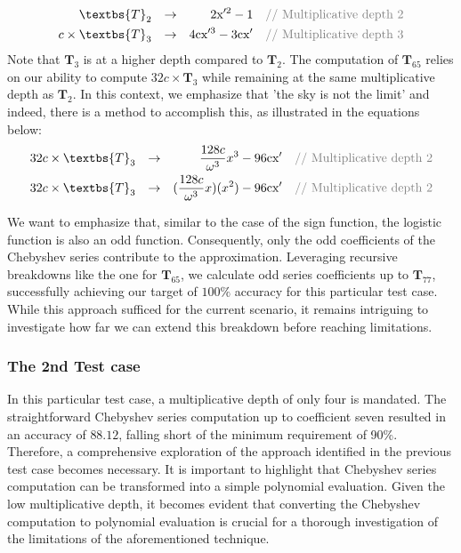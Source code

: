 \documentclass[journal=tosc,final]{iacrtrans}
\begin{document}
 \begin{align}
    \textbs{T}_{2} && \rightarrow && \text{2x}'^2-1 && \text{\textcolor{gray}{// Multiplicative depth 2}}\\
    c\times\textbs{T}_{3} && \rightarrow && \text{4cx}'^3-\text{3cx}'  && \text{\textcolor{gray}{// Multiplicative depth 3}}
\end{align}
Note that $\textbf{T}_3$ is at a higher depth compared to $\textbf{T}_2$. The computation of $\textbf{T}_{65}$ relies on our ability to compute $32c\times\textbf{T}_3$ while remaining at the same multiplicative depth as $\textbf{T}_2$. In this context, we emphasize that 'the sky is not the limit' and indeed, there is a method to accomplish this, as illustrated in the equations below:
\begin{align}
     32c\times\textbs{T}_{3} && \rightarrow && \frac{128c}{\omega^3} x^3-\text{96cx}'  && \text{\textcolor{gray}{// Multiplicative depth 2}}\\
     32c\times\textbs{T}_{3} && \rightarrow && (\frac{128c}{\omega^3}x)(x^2)-\text{96cx}'  && \text{\textcolor{gray}{// Multiplicative depth 2}}
\end{align}

We want to emphasize that, similar to the case of the sign function, the logistic function is also an odd function. Consequently, only the odd coefficients of the Chebyshev series contribute to the approximation. Leveraging recursive breakdowns like the one for $\textbf{T}_{65}$, we calculate odd series coefficients up to $\textbf{T}_{77}$, successfully achieving our target of $100\%$ accuracy for this particular test case. While this approach sufficed for the current scenario, it remains intriguing to investigate how far we can extend this breakdown before reaching limitations. 
 
 \subsubsection{The 2nd Test case}
In this particular test case, a multiplicative depth of only four is mandated. The straightforward Chebyshev series computation up to coefficient seven resulted in an accuracy of $88.12$, falling short of the minimum requirement of 90\%. Therefore, a comprehensive exploration of the approach identified in the previous test case becomes necessary. It is important to highlight that Chebyshev series computation can be transformed into a simple polynomial evaluation. Given the low multiplicative depth, it becomes evident that converting the Chebyshev computation to polynomial evaluation is crucial for a thorough investigation of the limitations of the aforementioned technique.
\end{document}
